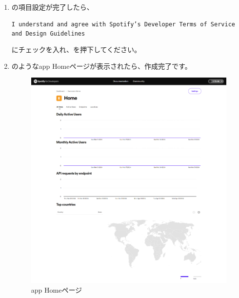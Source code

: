 \begin{enumerate}
                \newpage
                \item {}の項目設定が完了したら、
                \label{item:spotify8}
                    \begin{screen}
                        \texttt{I understand and agree with Spotify's Developer Terms of Service and Design Guidelines}
                    \end{screen}
                    にチェックを入れ、を押下してください。

                \item {}のようなapp Homeページが表示されたら、作成完了です。
                \label{item:spotify9}
                    \begin{figure}[htbp]
                        \centering
                        \includegraphics[width=\linewidth]{./pictures/Spotify7.png}
                        \caption{app Homeページ}
                        \label{img:spotify7}
                    \end{figure}
            \end{enumerate}

        \newpage
